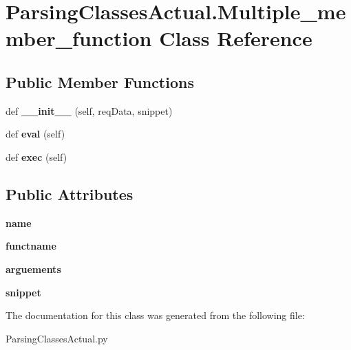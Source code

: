 \hypertarget{class_parsing_classes_actual_1_1_multiple__member__function}{}\section{Parsing\+Classes\+Actual.\+Multiple\+\_\+member\+\_\+function Class Reference}
\label{class_parsing_classes_actual_1_1_multiple__member__function}
\subsection*{Public Member Functions}
\begin{DoxyCompactItemize}
\item 
\mbox{\label{class_parsing_classes_actual_1_1_multiple__member__function_a27da0e19523b0219e7d58cd7dbabc9a9}} 
def {\bfseries \+\_\+\+\_\+init\+\_\+\+\_\+} (self, req\+Data, snippet)
\item 
\mbox{\label{class_parsing_classes_actual_1_1_multiple__member__function_a8d3e7a3f25b30947e82604271ad6c49d}} 
def {\bfseries eval} (self)
\item 
\mbox{\label{class_parsing_classes_actual_1_1_multiple__member__function_a3bc26d567ef38186228536c4234281ec}} 
def {\bfseries exec} (self)
\end{DoxyCompactItemize}
\subsection*{Public Attributes}
\begin{DoxyCompactItemize}
\item 
\mbox{\label{class_parsing_classes_actual_1_1_multiple__member__function_a8d1095e288eba5cd271dd0300590ecc5}} 
{\bfseries name}
\item 
\mbox{\label{class_parsing_classes_actual_1_1_multiple__member__function_afe344b4cf0e1d608d4e5697364bcbd93}} 
{\bfseries functname}
\item 
\mbox{\label{class_parsing_classes_actual_1_1_multiple__member__function_a19dfea13ddeb0c4340b987575e5f2402}} 
{\bfseries arguements}
\item 
\mbox{\label{class_parsing_classes_actual_1_1_multiple__member__function_a766af60b5f794ead87ffcc726b50466e}} 
{\bfseries snippet}
\end{DoxyCompactItemize}


The documentation for this class was generated from the following file\+:\begin{DoxyCompactItemize}
\item 
Parsing\+Classes\+Actual.\+py\end{DoxyCompactItemize}
